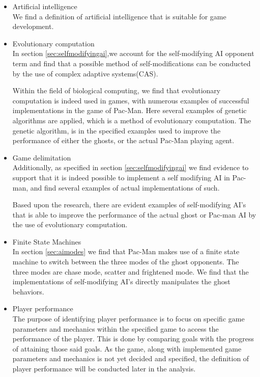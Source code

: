 \begin{itemize}
\item Artificial intelligence\\
We find a definition of artificial intelligence that is suitable for game development.

\item Evolutionary computation\\
In section \ref{sec:selfmodifyingai},we account for the self-modifying AI opponent term and find that a possible method of self-modifications can be conducted by the use of complex adaptive systems(CAS).


Within the field of biological computing, we find that evolutionary computation is indeed used in games, with numerous examples of successful implementations in the game of Pac-Man. Here several examples of genetic algorithms are applied, which is a method of evolutionary computation. The genetic algorithm, is in the specified examples used to improve the performance of either the ghosts, or the actual Pac-Man playing agent.

\item Game delimitation\\
Additionally, as specified in section \ref{sec:selfmodifyingai} we find evidence to support that it is indeed possible to implement a self modifying AI in Pac-man, and find several examples of actual implementations of such.

Based upon the research, there are evident examples of self-modifying AI's that is able to improve the performance of the actual ghost or Pac-man AI by the use of evolutionary computation.

\item Finite State Machines\\
In section \ref{sec:aimodes} we find that Pac-Man makes use of a finite state machine to switch between the three modes of the ghost opponents. The three modes are chase mode, scatter and frightened mode. We find that the implementations of self-modifying AI's directly manipulates the ghost behaviors.

\item Player performance\\
The purpose of identifying player performance is to focus on specific game parameters and mechanics within the specified game to access the performance of the player. This is done by comparing goals with the progress of attaining those said goals. As the game, along with implemented game parameters and mechanics is not yet decided and specified, the definition of player performance will be conducted later in the analysis.
\end{itemize}

